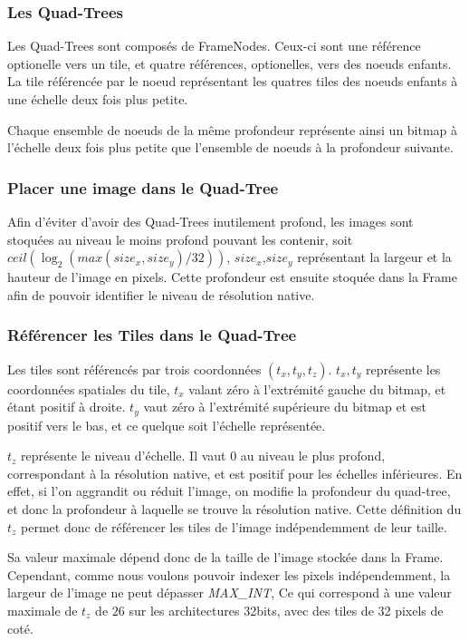 			\subsubsection{Les Quad-Trees}
				Les Quad-Trees sont composés de FrameNodes. Ceux-ci sont une référence optionelle vers un tile, et quatre références, optionelles,
				vers des noeuds enfants. La tile référencée par le noeud représentant les quatres tiles des noeuds enfants à une échelle deux
				fois plus petite.

				Chaque ensemble de noeuds de la même profondeur représente ainsi un bitmap à l'échelle deux fois plus petite que l'ensemble de
				noeuds à la profondeur suivante.

			\subsubsection{Placer une image dans le Quad-Tree}
				Afin d'éviter d'avoir des Quad-Trees inutilement profond, les images sont stoquées au niveau le moins profond pouvant les contenir,
				soit $ceil( \log_2( max(size_x,size_y)/32))$, $size_x$,$size_y$ représentant la largeur et la hauteur de l'image en pixels.
				Cette profondeur est ensuite stoquée dans la Frame afin de pouvoir identifier le niveau de résolution native.

			\subsubsection{Référencer les Tiles dans le Quad-Tree}
				Les tiles sont référencés par trois coordonnées $(t_x,t_y,t_z)$. $t_x,t_y$ représente les coordonnées spatiales du tile, $t_x$ valant
				zéro à l'extrémité gauche du bitmap, et étant positif à droite. $t_y$ vaut zéro à l'extrémité supérieure du bitmap et est positif vers le bas,
				et ce quelque soit l'échelle représentée.
				
				$t_z$ représente le niveau d'échelle. Il vaut $0$ au niveau le plus profond, correspondant à la résolution native, et est positif
				pour les échelles inférieures. En effet, si l'on aggrandit ou réduit l'image, on modifie la profondeur du quad-tree, et donc la profondeur à 
				laquelle se trouve la résolution native. Cette définition du $t_z$ permet donc de référencer les tiles de l'image indépendemment de leur taille.
				
				Sa valeur maximale dépend donc de la taille de l'image stockée
				dans la Frame. Cependant, comme nous voulons pouvoir indexer les pixels indépendemment, la largeur de l'image ne peut dépasser
				\emph{MAX\_INT}, Ce qui correspond à une valeur maximale de $t_z$ de $26$ sur les architectures 32bits, avec des tiles de 32 pixels
				de coté.
				
